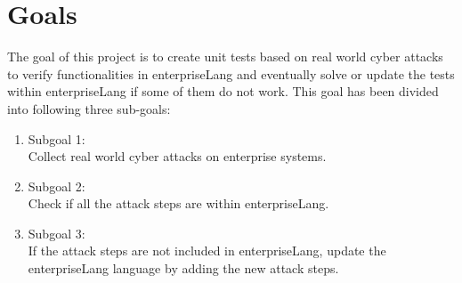 \documentclass[english]{kththesis}
\begin{document}

\section{Goals}

The goal of this project is to create unit tests based on real world cyber attacks to verify functionalities in enterpriseLang and eventually solve or update the tests within enterpriseLang if some of them do not work. This goal has been divided into following three sub-goals:

\begin{enumerate}
\item Subgoal 1: %
\\Collect real world cyber attacks on enterprise systems.
\item Subgoal 2: %
\\Check if all the attack steps are within enterpriseLang.
\item Subgoal 3: %
\\If the attack steps are not included in enterpriseLang, update the enterpriseLang language by adding the new attack steps.
\end{enumerate}

\end{document}
